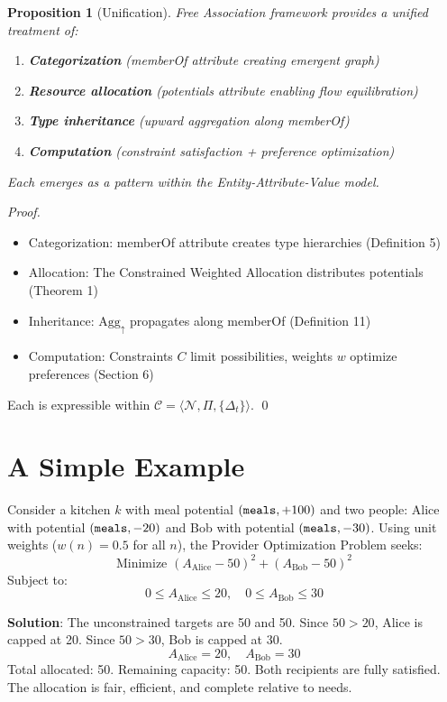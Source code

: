 \documentclass[11pt]{article}
\newtheorem{proposition}{Proposition}
\begin{document}
\begin{proposition}[Unification]
Free Association framework provides a unified treatment of:
\begin{enumerate}
\item \textbf{Categorization} (memberOf attribute creating emergent graph)
\item \textbf{Resource allocation} (potentials attribute enabling flow equilibration)
\item \textbf{Type inheritance} (upward aggregation along memberOf)
\item \textbf{Computation} (constraint satisfaction + preference optimization)
\end{enumerate}
Each emerges as a pattern within the Entity-Attribute-Value model.
\end{proposition}

\begin{proof}
\begin{itemize}
\item Categorization: memberOf attribute creates type hierarchies (Definition 5)
\item Allocation: The Constrained Weighted Allocation distributes potentials (Theorem 1)
\item Inheritance: $\text{Agg}_\uparrow$ propagates along memberOf (Definition 11)
\item Computation: Constraints $C$ limit possibilities, weights $w$ optimize preferences (Section 6)
\end{itemize}
Each is expressible within $\mathcal{C} = \langle \mathcal{N}, \Pi, \{\Delta_t\} \rangle$. \qed
\end{proof}

\section{A Simple Example}

Consider a kitchen $k$ with meal potential $({\tt meals}, +100)$ and two people: Alice with potential $({\tt meals}, -20)$ and Bob with potential $({\tt meals}, -30)$. Using unit weights ($w(n) = 0.5$ for all $n$), the Provider Optimization Problem seeks:
\[
\text{Minimize } (A_{\text{Alice}} - 50)^2 + (A_{\text{Bob}} - 50)^2
\]
Subject to:
\[
0 \le A_{\text{Alice}} \le 20, \quad 0 \le A_{\text{Bob}} \le 30
\]

\textbf{Solution}:
The unconstrained targets are 50 and 50. Since $50 > 20$, Alice is capped at 20. Since $50 > 30$, Bob is capped at 30.
\[
A_{\text{Alice}} = 20, \quad A_{\text{Bob}} = 30
\]
Total allocated: 50. Remaining capacity: 50.
Both recipients are fully satisfied. The allocation is fair, efficient, and complete relative to needs.
\end{document}
